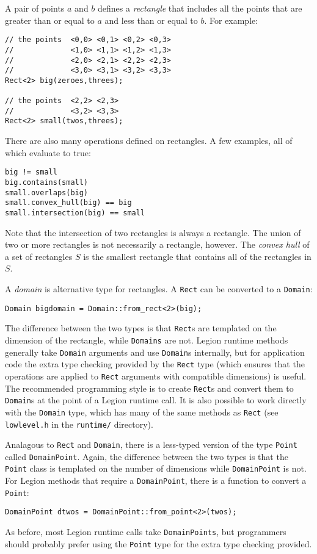 \documentclass[11pt]{book}
\begin{document}
A pair of points $a$ and $b$ defines a {\em rectangle} that includes all the points that are greater than or equal to $a$
and less than or equal to $b$.  For example:
\begin{verbatim}
// the points  <0,0> <0,1> <0,2> <0,3> 
//             <1,0> <1,1> <1,2> <1,3>
//             <2,0> <2,1> <2,2> <2,3>
//             <3,0> <3,1> <3,2> <3,3>
Rect<2> big(zeroes,threes);  

// the points  <2,2> <2,3>
//             <3,2> <3,3>
Rect<2> small(twos,threes);
\end{verbatim}
There are also many operations defined on rectangles.  A few examples, all of which evaluate to true:
\begin{verbatim}
big != small                       
big.contains(small)                
small.overlaps(big)                
small.convex_hull(big) == big      
small.intersection(big) == small   
\end{verbatim}
Note that the intersection of two rectangles is always a rectangle.  The union of two or more rectangles is not necessarily a 
rectangle, however. The {\em convex hull} of a set of rectangles $S$ is the smallest rectangle that contains all of the rectangles
in $S$.

A {\em domain} is alternative type for rectangles.  A {\tt Rect} can be converted to a {\tt Domain}:
\begin{verbatim}
Domain bigdomain = Domain::from_rect<2>(big);
\end{verbatim}
The difference between the two types is that {\tt Rect}s are templated on the dimension of the rectangle, while {\tt Domains}
are not.  Legion runtime methods generally take {\tt Domain} arguments and use {\tt Domain}s internally, but for application
code the extra type checking provided by the {\tt Rect} type (which ensures that the operations are applied to {\tt Rect} arguments
with compatible dimensions) is useful.  The recommended programming style is to create {\tt Rect}s and convert them to {\tt Domain}s
at the point of a Legion runtime call.  It is also possible to work directly with the {\tt Domain} type, which has many
of the same methods as {\tt Rect} (see {\tt lowlevel.h} in the {\tt runtime/} directory).

Analagous to {\tt Rect} and {\tt Domain}, there is a less-typed version of the type {\tt Point} called {\tt DomainPoint}.
Again, the difference between the two types is that the {\tt Point} class is templated on the number of dimensions 
while {\tt DomainPoint} is not.  For Legion methods that require a {\tt DomainPoint}, there is a function to convert a
{\tt Point}:
\begin{verbatim}
DomainPoint dtwos = DomainPoint::from_point<2>(twos);
\end{verbatim}
As before, most Legion runtime calls take {\tt DomainPoints}, but programmers should probably prefer using the {\tt Point} type
for the extra type checking provided.
\end{document}
